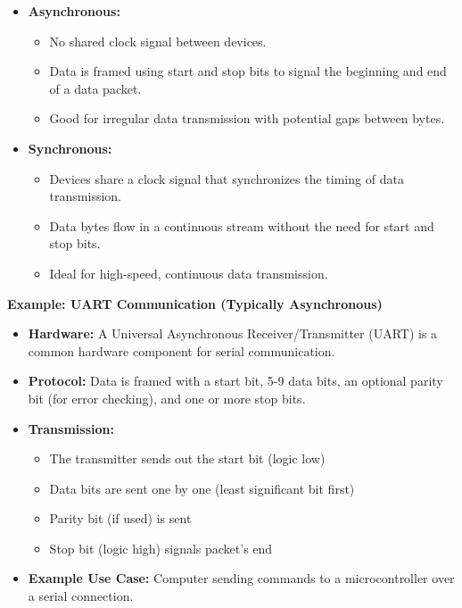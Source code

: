 \documentclass[
]{article}
\begin{document}
\begin{itemize}
\item
  \textbf{Asynchronous:}

  \begin{itemize}
  \item
    No shared clock signal between devices.
  \item
    Data is framed using start and stop bits to signal the beginning and
    end of a data packet.
  \item
    Good for irregular data transmission with potential gaps between
    bytes.
  \end{itemize}
\item
  \textbf{Synchronous:}

  \begin{itemize}
  \item
    Devices share a clock signal that synchronizes the timing of data
    transmission.
  \item
    Data bytes flow in a continuous stream without the need for start
    and stop bits.
  \item
    Ideal for high-speed, continuous data transmission.
  \end{itemize}
\end{itemize}

\textbf{Example: UART Communication (Typically Asynchronous)}

\begin{itemize}
\item
  \textbf{Hardware:} A Universal Asynchronous Receiver/Transmitter
  (UART) is a common hardware component for serial communication.
\item
  \textbf{Protocol:} Data is framed with a start bit, 5-9 data bits, an
  optional parity bit (for error checking), and one or more stop bits.
\item
  \textbf{Transmission:}

  \begin{itemize}
  \item
    The transmitter sends out the start bit (logic low)
  \item
    Data bits are sent one by one (least significant bit first)
  \item
    Parity bit (if used) is sent
  \item
    Stop bit (logic high) signals packet's end
  \end{itemize}
\item
  \textbf{Example Use Case:} Computer sending commands to a
  microcontroller over a serial connection.
\end{itemize}
\end{document}
